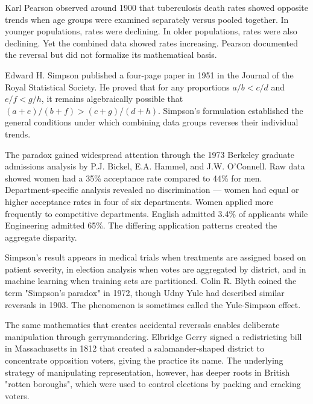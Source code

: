 \begin{historical}
Karl Pearson observed around 1900 that tuberculosis death rates showed opposite trends when age groups were examined separately versus pooled together. In younger populations, rates were declining. In older populations, rates were also declining. Yet the combined data showed rates increasing. Pearson documented the reversal but did not formalize its mathematical basis.

Edward H. Simpson published a four-page paper in 1951 in the Journal of the Royal Statistical Society. He proved that for any proportions $a/b < c/d$ and $e/f < g/h$, it remains algebraically possible that $(a+e)/(b+f) > (c+g)/(d+h)$. Simpson's formulation established the general conditions under which combining data groups reverses their individual trends.

The paradox gained widespread attention through the 1973 Berkeley graduate admissions analysis by P.J. Bickel, E.A. Hammel, and J.W. O'Connell. Raw data showed women had a 35\% acceptance rate compared to 44\% for men. Department-specific analysis revealed no discrimination — women had equal or higher acceptance rates in four of six departments. Women applied more frequently to competitive departments. English admitted 3.4\% of applicants while Engineering admitted 65\%. The differing application patterns created the aggregate disparity.

Simpson's result appears in medical trials when treatments are assigned based on patient severity, in election analysis when votes are aggregated by district, and in machine learning when training sets are partitioned. Colin R. Blyth coined the term "Simpson's paradox" in 1972, though Udny Yule had described similar reversals in 1903. The phenomenon is sometimes called the Yule-Simpson effect.

The same mathematics that creates accidental reversals enables deliberate manipulation through gerrymandering. Elbridge Gerry signed a redistricting bill in Massachusetts in 1812 that created a salamander-shaped district to concentrate opposition voters, giving the practice its name. The underlying strategy of manipulating representation, however, has deeper roots in British "rotten boroughs", which were used to control elections by packing and cracking voters.


\end{historical}
